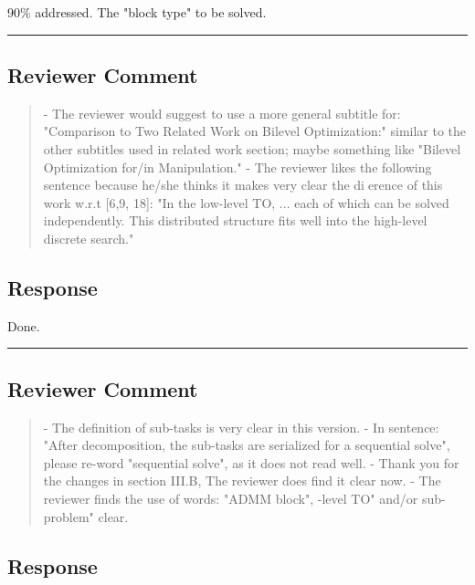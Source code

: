 90\% addressed. The "block type" to be solved.

\noindent\rule{17cm}{2.0pt}

\subsection{Reviewer Comment}
\begin{mdframed}
\begin{quote}
- The reviewer would suggest to use a more general subtitle for: "Comparison to Two Related Work on
Bilevel Optimization:" similar to the other subtitles used in related work section; maybe something like
"Bilevel Optimization for/in Manipulation."
- The reviewer likes the following sentence because he/she thinks it makes very clear the dierence of this
work w.r.t [6,9, 18]: "In the low-level TO, ... each of which can be solved independently. This distributed
structure fits well into the high-level discrete search."
\end{quote}
\end{mdframed}

\subsection{Response} 

Done.

\noindent\rule{17cm}{2.0pt}

\subsection{Reviewer Comment}
\begin{mdframed}
\begin{quote}
- The definition of sub-tasks is very clear in this version.
- In sentence: "After decomposition, the sub-tasks are serialized for a sequential solve", please re-word
"sequential solve", as it does not read well.
- Thank you for the changes in section III.B, The reviewer does find it clear now.
- The reviewer finds the use of words: "ADMM block", \low-level TO" and/or \TO sub-problem" clear.
\end{quote}
\end{mdframed}

\subsection{Response} 


